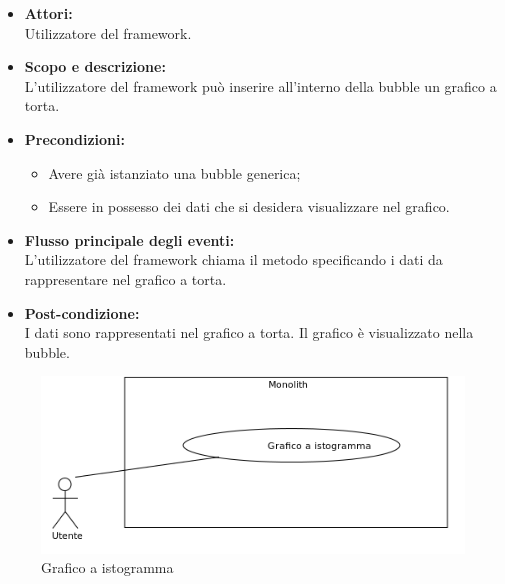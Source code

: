 \begin{itemize}
	\item \textbf{Attori:}
	\\Utilizzatore del framework.
	\item \textbf{Scopo e descrizione:} 
	\\L'utilizzatore del framework può inserire all'interno della bubble un grafico a torta.
	\item \textbf{Precondizioni:}
	\begin{itemize}
		\item Avere già istanziato una bubble generica;
		\item Essere in possesso dei dati che si desidera visualizzare nel grafico.
	\end{itemize}
	\item \textbf{Flusso principale degli eventi:}
	\\L'utilizzatore del framework chiama il metodo specificando i dati da rappresentare nel grafico a torta.
	\item \textbf{Post-condizione:}
	\\I dati sono rappresentati nel grafico a torta. Il grafico è visualizzato nella bubble.
\end{itemize}


\begin{figure}[H]
	\centering
	\includegraphics[width=15cm]{../../documenti/AnalisiDeiRequisiti/Diagrammi_img/uc1_29.png}
	\caption{\UCFCaption{} Grafico a istogramma}
\end{figure}

